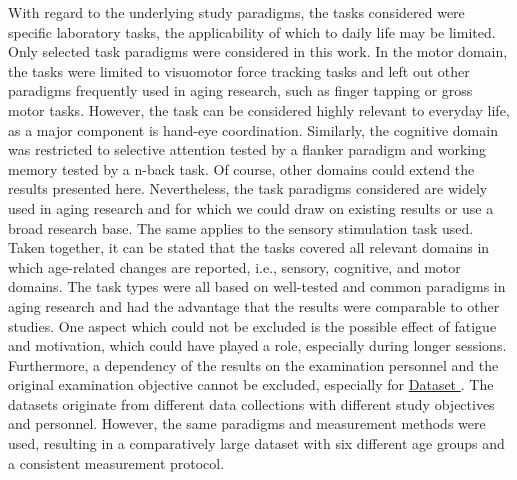 With regard to the underlying study paradigms, the tasks considered were specific laboratory tasks, the applicability of which to daily life may be limited. Only selected task paradigms were considered in this work. In the motor domain, the tasks were limited to visuomotor force tracking tasks and left out other paradigms frequently used in aging research, such as finger tapping or gross motor tasks. However, the task can be considered highly relevant to everyday life, as a major component is hand-eye coordination. Similarly, the cognitive domain was restricted to selective attention tested by a flanker paradigm and working memory tested by a n-back task. Of course, other domains could extend the results presented here. Nevertheless, the task paradigms considered are widely used in aging research and for which we could draw on existing results or use a broad research base. The same applies to the sensory stimulation task used. Taken together, it can be stated that the tasks covered all relevant domains in which age-related changes are reported, i.e., sensory, cognitive, and motor domains. The task types were all based on well-tested and common paradigms in aging research and had the advantage that the results were comparable to other studies. One aspect which could not be excluded is the possible effect of fatigue and motivation, which could have played a role, especially during longer sessions. Furthermore, a dependency of the results on the examination personnel and the original examination objective cannot be excluded, especially for \hyperref[methods:datasets:II]{Dataset }. The datasets originate from different data collections with different study objectives and personnel. However, the same paradigms and measurement methods were used, resulting in a comparatively large dataset with six different age groups and a consistent measurement protocol.\\
